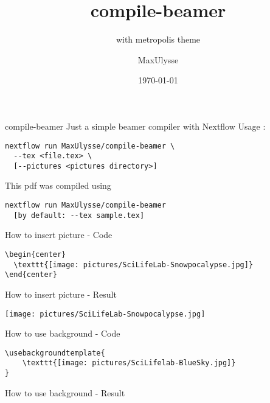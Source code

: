 \documentclass{beamer}
\author{MaxUlysse}
\title{compile-beamer}
\subtitle{with metropolis theme}
\institute{
	SciLifeLab - Karolinska Institutet\\
	\vfill
	\texttt{[image: pictures/SciLifeLab]}
	\hfill
	\texttt{[image: pictures/KI]}
	\vfill
}
\date{\today}
\begin{document}
\maketitle

\begin{frame}[fragile]{compile-beamer}
  Just a simple beamer compiler with Nextflow
  Usage :
  \begin{verbatim}
nextflow run MaxUlysse/compile-beamer \
  --tex <file.tex> \
  [--pictures <pictures directory>]
  \end{verbatim}
  This pdf was compiled using
  \begin{verbatim}
nextflow run MaxUlysse/compile-beamer
  [by default: --tex sample.tex]
  \end{verbatim}
\end{frame}

\begin{frame}[fragile]{How to insert picture - Code}
  \begin{verbatim}
\begin{center}
  \texttt{[image: pictures/SciLifeLab-Snowpocalypse.jpg]}
\end{center}
  \end{verbatim}
\end{frame}

\begin{frame}{How to insert picture - Result}
  \begin{center}
    \texttt{[image: pictures/SciLifeLab-Snowpocalypse.jpg]}
  \end{center}
\end{frame}

\begin{frame}[fragile]{How to use background - Code}
  \begin{verbatim}
  \end{verbatim}
\end{frame}

\usebackgroundtemplate{
	\texttt{[image: pictures/SciLifelab-BlueSky.jpg]}
}

\begin{frame}{How to use background - Result}
\end{frame}
\end{document}
